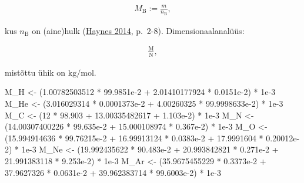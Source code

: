 \documentclass[
  12pt,
  a4paper,
  onecolumn, twoside]{article}
\newenvironment{Shaded}{\begin{snugshade}}{\end{snugshade}}
\newcommand{\DecValTok}[1]{\textcolor[rgb]{0.00,0.00,0.81}{#1}}
\newcommand{\FloatTok}[1]{\textcolor[rgb]{0.00,0.00,0.81}{#1}}
\newcommand{\NormalTok}[1]{#1}
\newcommand{\OtherTok}[1]{\textcolor[rgb]{0.56,0.35,0.01}{#1}}
\newcommand{\SpecialCharTok}[1]{\textcolor[rgb]{0.00,0.00,0.00}{#1}}
\begin{document}
\begin{align}
M_\mathrm{B} := \frac{m}{n_\mathrm{B}},
\label{eq:molar-mass}
\end{align}

kus \(n_\mathrm{B}\) on (aine)hulk (\protect\hyperlink{ref-haynes_2014_crc}{Haynes 2014}, p.~2-8). Dimensionaalanalüüs:

\begin{align}
\mathrm{\frac{M}{N}},
\label{eq:dimensional-analysis-for-molar-mass}
\end{align}

mistõttu ühik on \(\unit{\kilogram\per\mole}\).

\begin{Shaded}
\begin{Highlighting}[numbers=left,,]
\NormalTok{M\_H }\OtherTok{\textless{}{-}}\NormalTok{ (}\FloatTok{1.00782503512} \SpecialCharTok{*} \FloatTok{99.9851e{-}2} \SpecialCharTok{+} \FloatTok{2.01410177924} \SpecialCharTok{*} \FloatTok{0.0151e{-}2}\NormalTok{) }\SpecialCharTok{*} \FloatTok{1e{-}3}
\NormalTok{M\_He }\OtherTok{\textless{}{-}}\NormalTok{ (}\FloatTok{3.016029314} \SpecialCharTok{*} \FloatTok{0.0001373e{-}2} \SpecialCharTok{+} \FloatTok{4.00260325} \SpecialCharTok{*} \FloatTok{99.9998633e{-}2}\NormalTok{) }\SpecialCharTok{*} \FloatTok{1e{-}3}
\NormalTok{M\_C }\OtherTok{\textless{}{-}}\NormalTok{ (}\DecValTok{12} \SpecialCharTok{*} \FloatTok{98.903} \SpecialCharTok{+} \FloatTok{13.00335482617} \SpecialCharTok{+} \FloatTok{1.103e{-}2}\NormalTok{) }\SpecialCharTok{*} \FloatTok{1e{-}3}
\NormalTok{M\_N }\OtherTok{\textless{}{-}}\NormalTok{ (}\FloatTok{14.00307400226} \SpecialCharTok{*} \FloatTok{99.635e{-}2} \SpecialCharTok{+} \FloatTok{15.000108974} \SpecialCharTok{*} \FloatTok{0.367e{-}2}\NormalTok{) }\SpecialCharTok{*} \FloatTok{1e{-}3}
\NormalTok{M\_O }\OtherTok{\textless{}{-}}\NormalTok{ (}\FloatTok{15.994914636} \SpecialCharTok{*} \FloatTok{99.76215e{-}2} \SpecialCharTok{+} \FloatTok{16.99913124} \SpecialCharTok{*} \FloatTok{0.0383e{-}2} \SpecialCharTok{+} \FloatTok{17.9991604} \SpecialCharTok{*} \FloatTok{0.20012e{-}2}\NormalTok{) }\SpecialCharTok{*} \FloatTok{1e{-}3}
\NormalTok{M\_Ne }\OtherTok{\textless{}{-}}\NormalTok{ (}\FloatTok{19.992435622} \SpecialCharTok{*} \FloatTok{90.483e{-}2} \SpecialCharTok{+} \FloatTok{20.993842821} \SpecialCharTok{*} \FloatTok{0.271e{-}2} \SpecialCharTok{+} \FloatTok{21.991383118} \SpecialCharTok{*} \FloatTok{9.253e{-}2}\NormalTok{) }\SpecialCharTok{*} \FloatTok{1e{-}3}
\NormalTok{M\_Ar }\OtherTok{\textless{}{-}}\NormalTok{ (}\FloatTok{35.9675455229} \SpecialCharTok{*} \FloatTok{0.3373e{-}2} \SpecialCharTok{+} \FloatTok{37.9627326} \SpecialCharTok{*} \FloatTok{0.0631e{-}2} \SpecialCharTok{+} \FloatTok{39.962383714} \SpecialCharTok{*} \FloatTok{99.6003e{-}2}\NormalTok{) }\SpecialCharTok{*} \FloatTok{1e{-}3}

\end{Highlighting}
\end{Shaded}
\end{document}
